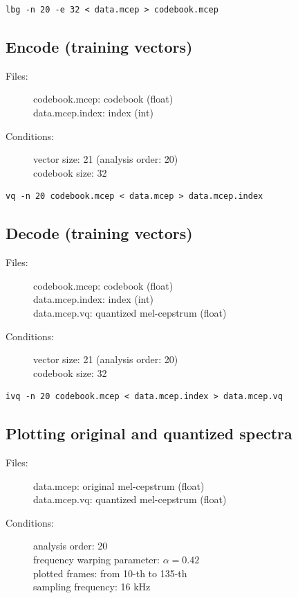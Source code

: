 \documentclass[a4paper,10pt]{article}
\begin{document}
\begin{verbatim}
lbg -n 20 -e 32 < data.mcep > codebook.mcep
\end{verbatim}

\subsection{Encode (training vectors)}

\begin{description}
\item[Files:]
   codebook.mcep: codebook (float)\\
   data.mcep.index: index (int)
\item[Conditions:]
   vector size: 21 (analysis order: 20)\\
   codebook size: 32
\end{description}

\begin{verbatim}
vq -n 20 codebook.mcep < data.mcep > data.mcep.index
\end{verbatim}

\subsection{Decode (training vectors)}

\begin{description}
\item[Files:]
   codebook.mcep: codebook (float)\\
   data.mcep.index: index (int)\\
   data.mcep.vq: quantized mel-cepstrum (float)
\item[Conditions:]
   vector size: 21 (analysis order: 20)\\
   codebook size: 32
\end{description}

\begin{verbatim}
ivq -n 20 codebook.mcep < data.mcep.index > data.mcep.vq
\end{verbatim}

\subsection{Plotting original and quantized spectra}

\begin{description}
\item[Files:]
  data.mcep: original mel-cepstrum (float)\\
  data.mcep.vq: quantized mel-cepstrum (float)
\item[Conditions:]
  analysis order: 20\\
  frequency warping parameter: $\alpha = 0.42$\\
  plotted frames: from 10-th to 135-th\\
  sampling frequency: 16 kHz
\end{description}
\end{document}
